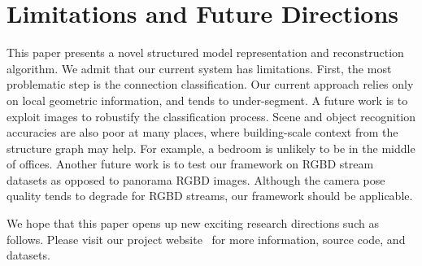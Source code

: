 \section{Limitations and Future Directions}

This paper presents a novel structured model representation and
reconstruction algorithm.
We admit that our current system has limitations. First, the most
problematic step is the connection classification. Our current approach
relies only on local geometric information, and tends to under-segment.
A future work is to exploit images to robustify the classification
process. Scene and object recognition accuracies are also poor at many
places, where building-scale context from the structure graph may
help. For example, a bedroom is unlikely to be in the middle of offices.
Another future work is to test our framework on RGBD stream datasets as
opposed to panorama RGBD images. Although the camera pose quality tends
to degrade for RGBD streams, our framework should be applicable. 

We hope that this paper opens up new exciting research directions such as
follows. Please visit our project website~\cite{SIMProject} for
more information, source code, and datasets.

